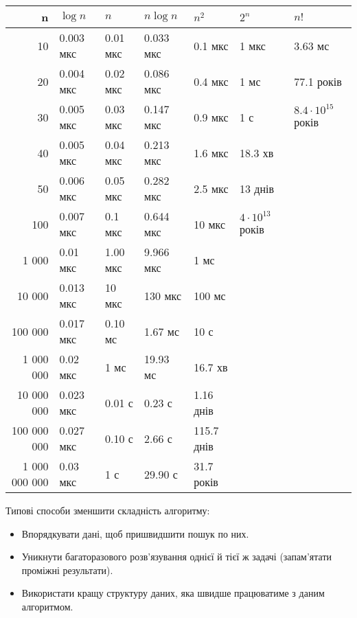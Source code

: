 \documentclass[12pt,a4paper]{report}
\begin{document}
\scalebox{0.7} {
    \begin{tabular}{r|llllll}
    \toprule
    n               & \(\log{}n\)  & \(n\)       & \(n \log{}n\) & \(n^2\)       & \(2^n\)     & \(n!\) \\
    \midrule
    10              & 0.003 мкс    & 0.01 мкс    & 0.033 мкс     & 0.1 мкс       & 1 мкс       & 3.63 мс \\
    20              & 0.004 мкс    & 0.02 мкс    & 0.086 мкс     & 0.4 мкс       & 1 мс        & 77.1 років \\
    30              & 0.005 мкс    & 0.03 мкс    & 0.147 мкс     & 0.9 мкс       & 1 с         & \(8.4 \cdot 10^{15}\) років \\
    40              & 0.005 мкс    & 0.04 мкс    & 0.213 мкс     & 1.6 мкс       & 18.3 хв     & \\
    50              & 0.006 мкс    & 0.05 мкс    & 0.282 мкс     & 2.5 мкс       & 13 днів     & \\
    \midrule
    100             & 0.007 мкс    & 0.1 мкс     & 0.644 мкс     & 10 мкс        & \(4 \cdot 10^{13}\) років & \\
    1 000           & 0.01  мкс    & 1.00 мкс    & 9.966 мкс     & 1 мс          &             & \\
    10 000          & 0.013 мкс    & 10 мкс      & 130 мкс       & 100 мс        &             & \\
    100 000         & 0.017 мкс    & 0.10 мс     & 1.67 мс       & 10 с          &             & \\
    1 000 000       & 0.02  мкс    & 1 мс        & 19.93 мс      & 16.7 хв       &             & \\
    10 000 000      & 0.023 мкс    & 0.01 с      & 0.23 с        & 1.16 днів     &             & \\
    100 000 000     & 0.027 мкс    & 0.10 с      & 2.66 с        & 115.7 днів    &             & \\
    1 000 000 000   & 0.03  мкс    & 1 с         & 29.90 с       & 31.7 років    &             & \\
    \bottomrule
    \end{tabular}
}

\vspace{1em}
Типові способи зменшити складність алгоритму:
\begin{itemize}
    \item Впорядкувати дані, щоб пришвидшити пошук по них.
    \item Уникнути багаторазового розв’язування однієї й тієї ж задачі (запам’ятати проміжні результати).
    \item Використати кращу структуру даних, яка швидше працюватиме з даним алгоритмом.
\end{itemize}
\end{document}
